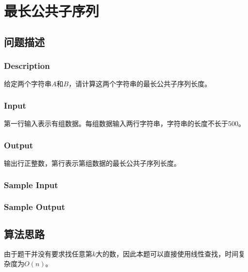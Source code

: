 \section{最长公共子序列}
\subsection{问题描述}
\subsubsection*{Description}
给定两个字符串$A$和$B$，请计算这两个字符串的最长公共子序列长度。

\subsubsection*{Input}

第一行输入表示有组数据。每组数据输入两行字符串，字符串的长度不长于500。

\subsubsection*{Output}

输出行正整数，第行表示第组数据的最长公共子序列长度。

\subsubsection*{Sample Input}






\subsubsection*{Sample Output}



\subsection{算法思路}

由于题干并没有要求找任意第$k$大的数，因此本题可以直接使用线性查找，时间复杂度为$O(n)$。

